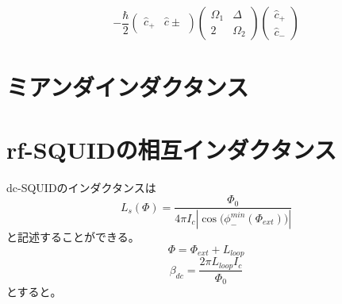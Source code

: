 \begin{equation}
    -\frac{\hbar}{2}\left(\begin{array}{cc}
    \hat{c}_{+} & \hat{c} \pm
    \end{array}\right)\left(\begin{array}{cc}
    \Omega_{1} & \Delta \\
    2 & \Omega_{2}
    \end{array}\right)\left(\begin{array}{l}
    \hat{c}_{+} \\
    \hat{c}_{-}
    \end{array}\right)
\end{equation}
\section{ミアンダインダクタンス}
\section{rf-SQUIDの相互インダクタンス}
dc-SQUIDのインダクタンスは
\begin{equation}
    L_{s}(\Phi)=\frac{\Phi_0}{4\pi I_{c}|{\cos({\phi_{-}^{min}(\Phi_{ext})}})|}
\end{equation}
と記述することができる。
\begin{equation}
    \Phi=\Phi_{ext}+L_{loop}
\end{equation}
\begin{equation}
    \beta_{dc}=\frac{2\pi L_{loop} I_{c}}{\Phi_{0}}
\end{equation}
とすると。
